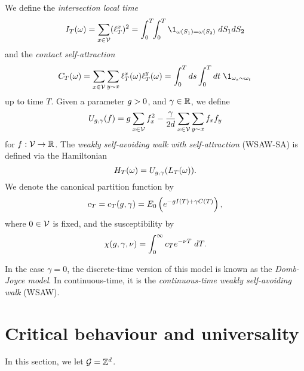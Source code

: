 We define the \emph{intersection local time}
\begin{equation}
\label{e:ITdef}
I_T(\omega) = \sum_{x\in\vertices} (\lt^x_T)^2
  =
\int_0^T \!\! \int_0^T \1_{\omega(S_1)=\omega(S_2)} \; dS_1 dS_2
\end{equation}
and the \emph{contact self-attraction}
\begin{equation}
\label{e:CTdef}
C_T(\omega) =
  \sum_{x \in \vertices} \sum_{y \sim x} \lt_T^x(\omega) \lt_T^y(\omega)
  = \int_0^T ds \int_0^T dt \; \1_{\omega_{s} \sim \omega_{t}}
\end{equation}
up to time $T$.
Given a parameter $g > 0$,
and $\gamma \in {\mathbb R}$, we define
\begin{equation}
\label{e:Udef-neg}
U_{g,\gamma}(f)
=
g \sum_{x\in\mathcal{V}} f_x^2
- \frac{\gamma}{2d}
\sum_{x\in\mathcal{V}} \sum_{y \sim x} f_x f_y
\end{equation}
for $f : \mathcal{V} \rightarrow {\mathbb R}$.
The \emph{weakly self-avoiding walk with self-attraction} (WSAW-SA) is defined via the Hamiltonian
\begin{equation}
H_T(\omega) = U_{g,\gamma}(L_T(\omega)).
\end{equation}
We denote the canonical partition function by
\begin{equation}
c_T = c_T(g, \gamma) = E_0 \left( e^{-g I(T) + \gamma C(T)} \right),
\end{equation}
where $0 \in \mathcal{V}$ is fixed, and the susceptibility by
\begin{equation}
\chi(g, \gamma, \nu) = \int_0^\infty c_T e^{-\nu T} \; dT.
\end{equation}

In the case $\gamma = 0$, the discrete-time version of this model is known as
the \emph{Domb-Joyce model}. In continuous-time, it is the
\emph{continuous-time weakly self-avoiding walk} (WSAW).


\section{Critical behaviour and universality}


In this section, we let $\mathcal{G} = { {{\mathbb Z}}^d }$.


